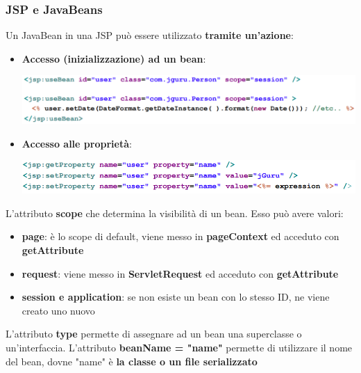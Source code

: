 \documentclass[12pt]{article}
\begin{document}
\subsubsection{JSP e JavaBeans}
Un JavaBean in una JSP può essere utilizzato \textbf{tramite un'azione}:
\begin{itemize}
    \item \textbf{Accesso (inizializzazione) ad un bean}:
    \begin{center}
        \includegraphics[width = 1\textwidth]{Images/204.png}
    \end{center}
    \item \textbf{Accesso alle proprietà}:
    \begin{center}
        \includegraphics[width = 1\textwidth]{Images/205.png}
    \end{center}
\end{itemize}
L'attributo \textbf{scope} che determina la visibilità di un bean. Esso può avere valori:
\begin{itemize}
    \item \textbf{page}: è lo scope di default, viene messo in \textbf{pageContext} ed acceduto con \textbf{getAttribute}
    \item \textbf{request}: viene messo in \textbf{ServletRequest} ed acceduto con \textbf{getAttribute}
    \item \textbf{session e application}: se non esiste un bean con lo stesso ID, ne viene creato uno nuovo
\end{itemize}
L'attributo \textbf{type} permette di assegnare ad un bean una superclasse o un'interfaccia.
L'attributo \textbf{beanName = "name"} permette di utilizzare il nome del bean, dovne "name" è \textbf{la classe o un file serializzato}
\end{document}
